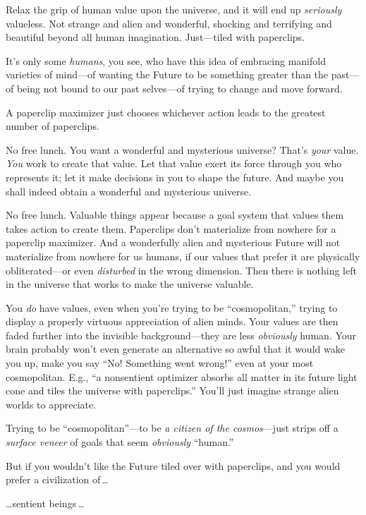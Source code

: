  Relax the grip of human value upon the universe, and it will end
up \textit{seriously} valueless. Not strange and alien and wonderful,
shocking and terrifying and beautiful beyond all human imagination.
Just---tiled with paperclips.


 It's only some \textit{humans}, you see, who have
this idea of embracing manifold varieties of mind---of wanting the
Future to be something greater than the past---of being not bound to
our past selves---of trying to change and move forward.


 A paperclip maximizer just chooses whichever action leads to the
greatest number of paperclips.


 No free lunch. You want a wonderful and mysterious universe?
That's \textit{your} value. \textit{You} work to create
that value. Let that value exert its force through you who represents
it; let it make decisions in you to shape the future. And maybe you
shall indeed obtain a wonderful and mysterious universe.


 No free lunch. Valuable things appear because a goal system that
values them takes action to create them. Paperclips
don't materialize from nowhere for a paperclip
maximizer. And a wonderfully alien and mysterious Future will not
materialize from nowhere for us humans, if our values that prefer it
are physically obliterated---or even \textit{disturbed} in the wrong
dimension. Then there is nothing left in the universe that works to
make the universe valuable.


 You \textit{do} have values, even when you're
trying to be ``cosmopolitan,''
trying to display a properly virtuous appreciation of alien minds. Your
values are then faded further into the invisible background{}---they
are less \textit{obviously} human. Your brain probably
won't even generate an alternative so awful that it
would wake you up, make you say ``No! Something went
wrong!'' even at your most cosmopolitan. E.g.,
``a nonsentient optimizer absorbs all matter in its
future light cone and tiles the universe with
paperclips.'' You'll just imagine
strange alien worlds to appreciate.


 Trying to be
``cosmopolitan''---to be \textit{a
citizen of the cosmos}{}---just strips off a \textit{surface veneer} of
goals that seem \textit{obviously}
``human.''


 But if you wouldn't like the Future tiled over
with paperclips, and you would prefer a civilization of\,\ldots


 \ldots sentient beings\,\ldots


